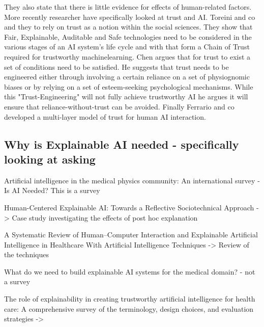 \documentclass[manuscript,screen,review]{acmart}
\begin{document}
They also state that there is little evidence for effects of human-related factors\cite{Hancock2011}.\\
More recently researcher have specifically looked at trust and AI.
Toreini and co and they to rely on trust as a notion within the social sciences.
They show that Fair, Explainable, Auditable and Safe technologies need to be considered in the
various stages of an AI system's life cycle and with that form a Chain of Trust required for trustworthy machinelearning\cite{Toreini2020}.
Chen argues that for trust to exist a set of conditions need to be satisfied.
He suggests that trust needs to be engineered either through involving a certain reliance on a set of physiognomic biases or by relying on a set of esteem-seeking psychological mechanisms.
While this "Trust-Engineering" will not fully achieve trustworthy AI he argues it will ensure that reliance-without-trust can be avoided\cite{Chen2021}.
Finally Ferrario and co developed a multi-layer model of trust for human AI interaction\cite{Ferrario2020}.

\subsection{Why is Explainable AI needed - specifically looking at asking}

Artificial intelligence in the medical physics community: An international survey - Is AI Needed? This is a survey

Human-Centered Explainable AI: Towards a Reflective Sociotechnical Approach -> Case study investigating the effects of post hoc explanation

A Systematic Review of Human–Computer Interaction and Explainable Artificial Intelligence in Healthcare With Artificial Intelligence Techniques -> Review of the techniques

What do we need to build explainable AI systems for the medical domain?  - not a survey

The role of explainability in creating trustworthy artificial intelligence for health care: A comprehensive survey of the terminology, design choices, and evaluation strategies -> 
\end{document}
